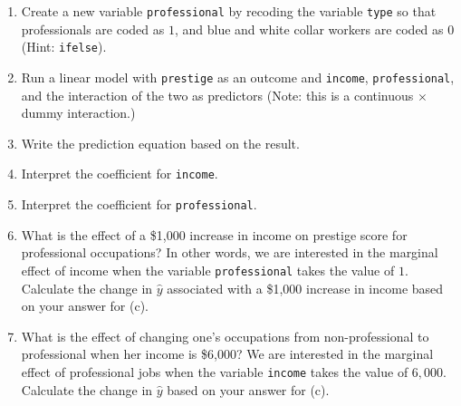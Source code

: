 \documentclass[12pt,letterpaper]{article}
\begin{document}
\newpage
\begin{enumerate}
	
	\item [(a)]
	Create a new variable \texttt{professional} by recoding the variable \texttt{type} so that professionals are coded as $1$, and blue and white collar workers are coded as $0$ (Hint: \texttt{ifelse}).
	
	\vspace{6cm}
	
	
	\item [(b)]
	Run a linear model with \texttt{prestige} as an outcome and \texttt{income}, \texttt{professional}, and the interaction of the two as predictors (Note: this is a continuous $\times$ dummy interaction.)
	
	\vspace{6cm}
	\item [(c)]
	Write the prediction equation based on the result.
	
\newpage
	\item [(d)]
	Interpret the coefficient for \texttt{income}.
	
	\vspace{10cm}	
	\item [(e)]
	Interpret the coefficient for \texttt{professional}.
	
	\newpage
	\item [(f)]
	What is the effect of a \$1,000 increase in income on prestige score for professional occupations? In other words, we are interested in the marginal effect of income when the variable \texttt{professional} takes the value of $1$. Calculate the change in $\hat{y}$ associated with a \$1,000 increase in income based on your answer for (c).
	
	\vspace{10cm}
	
	
	\item [(g)]
	What is the effect of changing one's occupations from non-professional to professional when her income is \$6,000? We are interested in the marginal effect of professional jobs when the variable \texttt{income} takes the value of $6,000$. Calculate the change in $\hat{y}$ based on your answer for (c).
	
	
\end{enumerate}

\newpage
\end{document}
